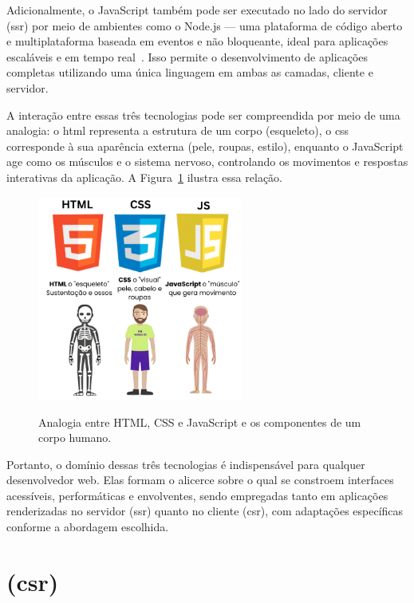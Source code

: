 Adicionalmente, o JavaScript também pode ser executado no lado do servidor (\acrshort{ssr}) por meio de ambientes como o Node.js — uma plataforma de código aberto e multiplataforma baseada em eventos e não bloqueante, ideal para aplicações escaláveis e em tempo real~\cite{nodejs2025, js2025}. Isso permite o desenvolvimento de aplicações completas utilizando uma única linguagem em ambas as camadas, cliente e servidor.

A interação entre essas três tecnologias pode ser compreendida por meio de uma analogia: o \acrshort{html} representa a estrutura de um corpo (esqueleto), o \acrshort{css} corresponde à sua aparência externa (pele, roupas, estilo), enquanto o JavaScript age como os músculos e o sistema nervoso, controlando os movimentos e respostas interativas da aplicação. A Figura~\ref{fig:html-css-js} ilustra essa relação.

\begin{figure}[H]
  \centering
  \caption{Analogia entre HTML, CSS e JavaScript e os componentes de um corpo humano.}
  \includegraphics[width=0.6\textwidth]{media/html_css_js_analogia.png}
  \label{fig:html-css-js}
\end{figure}

Portanto, o domínio dessas três tecnologias é indispensável para qualquer desenvolvedor web. Elas formam o alicerce sobre o qual se constroem interfaces acessíveis, performáticas e envolventes, sendo empregadas tanto em aplicações renderizadas no servidor (\acrshort{ssr}) quanto no cliente (\acrshort{csr}), com adaptações específicas conforme a abordagem escolhida.


\section{ (\acrshort{csr})}
\label{subsec:csr}


